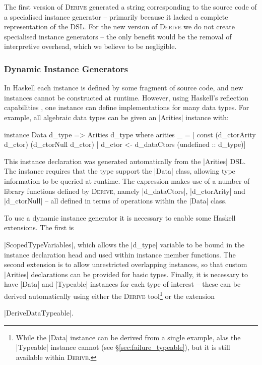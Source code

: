 \documentclass[preprint,draft]{sigplanconf}
\newcommand{\derive}{\textsc{Derive}}
\begin{document}
The first version of \derive{} generated a string corresponding to the source code of a specialised instance generator -- primarily because it lacked a complete representation of the DSL. For the new version of \derive{} we do not create specialised instance generators -- the only benefit would be the removal of interpretive overhead, which we believe to be negligible.

\subsubsection{Dynamic Instance Generators}
\label{sec:dynamic_instances}

In Haskell each instance is defined by some fragment of source code, and new instances cannot be constructed at runtime. However, using Haskell's reflection capabilities \cite{lammel:syb2}, one instance can define implementations for many data types. For example, all algebraic data types can be given an |Arities| instance with:

\begin{code}
instance Data d_type => Arities d_type where
    arities _ =  [  const (d_ctorArity d_ctor) (d_ctorNull d_ctor)
                 |  d_ctor <- d_dataCtors (undefined :: d_type)]
\end{code}

This instance declaration was generated automatically from the |Arities| DSL. The instance requires that the type support the |Data| class, allowing type information to be queried at runtime. The expression makes use of a number of library functions defined by \derive{}, namely |d_dataCtors|, |d_ctorArity| and |d_ctorNull| -- all defined in terms of operations within the |Data| class.

To use a dynamic instance generator it is necessary to enable some Haskell extensions. The first is \ignore|ScopedTypeVariables|, which allows the |d_type| variable to be bound in the instance declaration head and used within instance member functions. The second extension is to allow unrestricted overlapping instances, so that custom |Arities| declarations can be provided for basic types. Finally, it is necessary to have |Data| and |Typeable| instances for each type of interest -- these can be derived automatically using either the \derive{} tool\footnote{While the |Data| instance can be derived from a single example, alas the |Typeable| instance cannot (see \S\ref{sec:failure_typeable}), but it is still available within \derive{}.} or the extension \ignore|DeriveDataTypeable|.
\end{document}
